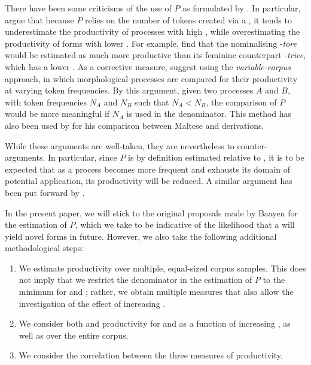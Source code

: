 \documentclass[output=paper]{LSP/langsci}
\begin{document}
\newpage 
There have been some criticisms of the use of $P$ as formulated by \citet{Baayen2009}. In particular, \citet{GaetaRicca2006} argue that because $P$ relies on the number of tokens created via a , it tends to underestimate the productivity of processes with high , while overestimating the productivity of forms with lower . For example, \citet{GaetaRicca2006} find that the  nominalising  -\textit{tore} would be estimated as much more productive than its feminine counterpart -\textit{trice}, which has a lower . As a corrective measure, \citet{GaetaRicca2006} suggest using the \textit{variable-corpus} approach, in which morphological processes are compared for their productivity at varying token frequencies. By this argument, given two processes $A$ and $B$, with token frequencies $N_{A}$ and $N_{B}$ such that $N_{A} < N_{B}$, the comparison of $P$ would be more meaningful if $N_{A}$ is used in the denominator. This method has also been used by \citet{Saade2016} for his comparison between Maltese and  derivations.

While these arguments are well-taken, they are nevertheless  to coun\-ter-arguments. In particular, since $P$ is by definition estimated relative to , it is to be expected that as a process becomes more frequent and exhausts its domain of potential application, its productivity will be reduced. A similar argument has been put forward by \citet{Baayen2009}.

In the present paper, we will stick to the original proposals made by Baayen for the estimation of $P$, which we take to be indicative of the likelihood that a  will yield novel forms in future. However, we also take the following additional methodological steps:

\begin{enumerate}
\item We estimate productivity over multiple, equal-sized corpus samples. This does not imply that we restrict the denominator in the estimation of $P$ to the minimum  for {\ar} and \zjoni; rather, we obtain multiple measures that also allow the investigation of the effect of increasing .
\item We consider both  and productivity for {\ar} and {\zjoni} as a function of increasing , as well as over the entire corpus.
\item We consider the correlation between the three measures of productivity.
\end{enumerate}
\end{document}
